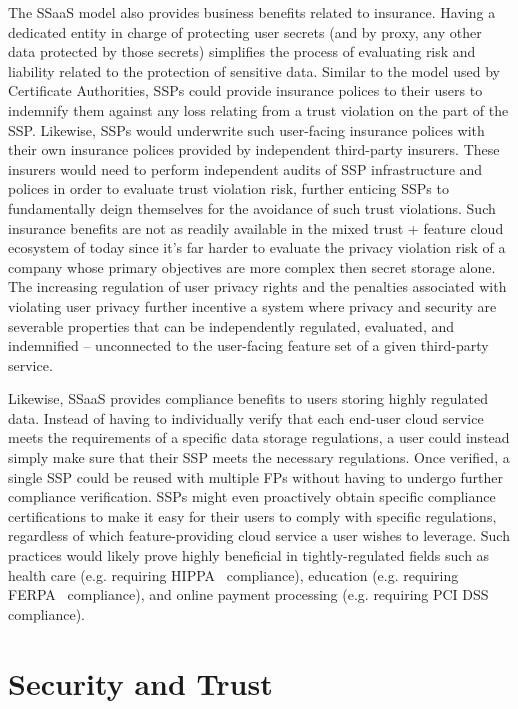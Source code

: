 The SSaaS model also provides business benefits related to
insurance. Having a dedicated entity in charge of protecting user
secrets (and by proxy, any other data protected by those secrets)
simplifies the process of evaluating risk and liability related to the
protection of sensitive data. Similar to the model used by Certificate
Authorities, SSPs could provide insurance polices to their users to
indemnify them against any loss relating from a trust violation on the
part of the SSP. Likewise, SSPs would underwrite such user-facing
insurance polices with their own insurance polices provided by
independent third-party insurers. These insurers would need to perform
independent audits of SSP infrastructure and polices in order to
evaluate trust violation risk, further enticing SSPs to fundamentally
deign themselves for the avoidance of such trust violations. Such
insurance benefits are not as readily available in the mixed trust +
feature cloud ecosystem of today since it's far harder to evaluate the
privacy violation risk of a company whose primary objectives are more
complex then secret storage alone. The increasing regulation of user
privacy rights and the penalties associated with violating user
privacy further incentive a system where privacy and security are
severable properties that can be independently regulated, evaluated,
and indemnified -- unconnected to the user-facing feature set of a
given third-party service.

Likewise, SSaaS provides compliance benefits to users storing highly
regulated data. Instead of having to individually verify that each
end-user cloud service meets the requirements of a specific data
storage regulations, a user could instead simply make sure that their
SSP meets the necessary regulations. Once verified, a single SSP could
be reused with multiple FPs without having to undergo further
compliance verification. SSPs might even proactively obtain specific
compliance certifications to make it easy for their users to comply
with specific regulations, regardless of which feature-providing cloud
service a user wishes to leverage. Such practices would likely prove
highly beneficial in tightly-regulated fields such as health care
(e.g. requiring HIPPA~\cite{hippa} compliance), education
(e.g. requiring FERPA~\cite{ferpa} compliance), and online payment
processing (e.g. requiring PCI DSS~\cite{pcidss} compliance).

\section{Security and Trust}
\label{chap:ssaas:trust}

